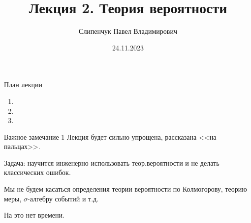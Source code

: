 
  

\title{Лекция 2. Теория вероятности}
\date{24.11.2023}
\author{Слипенчук Павел Владимирович}



  \maketitle
    
  \begin{frame}{План лекции}\label{frame:plan}
    \begin{enumerate}
	\item {}
	\item {}
	
	\item {}

	\end{enumerate}
 \end{frame}

\begin{frame}{Важное замечание 1}
Лекция будет сильно упрощена, 
рассказана
<<на пальцах>>.

Задача: научится инженерно использовать теор.вероятности и не делать классических ошибок.

Мы не будем касаться определения теории вероятности по Колмогорову,
теорию меры,
$\sigma$-алгебру событий 
и т.д.

На это нет времени.

\end{frame}

